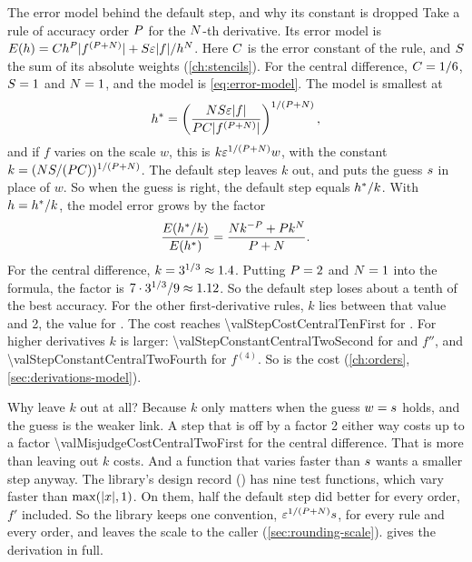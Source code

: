 \begin{sidebar}[label=sb:step-constant]{The error model behind the default step, and why its constant is dropped}
Take a rule of accuracy order $P$ for the $N$-th derivative. Its error model is
$E(h) = C h^{P} \lvert f^{(P + N)} \rvert + S \varepsilon \lvert f \rvert / h^{N}$. Here $C$ is the
error constant of the rule, and $S$ the sum of its absolute weights (\cref{ch:stencils}). For the central
difference, $C = 1/6$, $S = 1$ and $N = 1$, and the model is \cref{eq:error-model}. The model is
smallest at
\begin{equation*}
  h^{\ast} = \left( \frac{N S \varepsilon \lvert f \rvert}{P C \lvert f^{(P + N)} \rvert}
  \right)^{1/(P + N)},
\end{equation*}
and if $f$ varies on the scale $w$, this is $k \varepsilon^{1/(P + N)} w$, with the constant
$k = (N S / (P C))^{1/(P + N)}$. The default step leaves $k$ out, and puts the guess
$s$ in place of $w$. So when the guess is right, the default step equals $h^{\ast} / k$. With $h = h^{\ast} / k$,
the model error grows by the factor
\begin{equation*}
  \frac{E(h^{\ast} / k)}{E(h^{\ast})} = \frac{N k^{-P} + P k^{N}}{P + N}.
\end{equation*}
For the central difference, $k = 3^{1/3} \approx \num{1.4}$. Putting $P = 2$ and
$N = 1$ into the formula, the factor is $7 \cdot 3^{1/3} / 9 \approx \num{1.12}$. So
the default step loses about a tenth of the best accuracy. For the other first-derivative rules, $k$ lies between
that value and 2, the value for . The cost reaches \num{\valStepCostCentralTenFirst} for
. For higher derivatives $k$ is larger: \num{\valStepConstantCentralTwoSecond} for
 and $f''$, and \num{\valStepConstantCentralTwoFourth} for $f^{(4)}$. So is the cost
(\cref{ch:orders}, \cref{sec:derivations-model}).

Why leave $k$ out at all? Because $k$ only matters when the guess $w = s$ holds, and the guess is the weaker
link. A step that is off by a factor 2 either way costs up to a factor \num{\valMisjudgeCostCentralTwoFirst} for the
central difference. That is more than leaving out $k$ costs. And a function that varies faster than $s$ wants a
smaller step anyway. The library's design record () has nine test functions, which
vary faster than $\max(\lvert x \rvert, 1)$. On them, half the default step did better for every order, $f'$ included. So the
library keeps one convention, $\varepsilon^{1/(P + N)} s$, for every rule and every order, and leaves
the scale to the caller (\cref{sec:rounding-scale}).  gives the derivation in full.
\end{sidebar}

